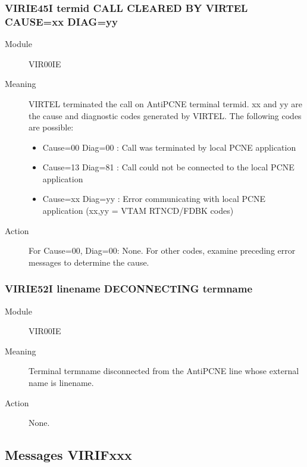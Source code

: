 \documentclass[letterpaper,10pt,english]{sphinxmanual}
\begin{document}
\subsubsection{VIRIE45I termid CALL CLEARED BY VIRTEL CAUSE=xx DIAG=yy}
\label{\detokenize{messages:virie45i-termid-call-cleared-by-virtel-cause-xx-diag-yy}}\begin{description}
\item[{Module}] \leavevmode
VIR00IE

\item[{Meaning}] \leavevmode
VIRTEL terminated the call on AntiPCNE terminal termid. xx and yy are the cause and diagnostic codes generated by VIRTEL. The following codes are possible:
\begin{itemize}
\item {} 
Cause=00 Diag=00 : Call was terminated by local PCNE application

\item {} 
Cause=13 Diag=81 : Call could not be connected to the local PCNE application

\item {} 
Cause=xx Diag=yy : Error communicating with local PCNE application (xx,yy = VTAM RTNCD/FDBK codes)

\end{itemize}

\item[{Action}] \leavevmode
For Cause=00, Diag=00: None. For other codes, examine preceding error messages to determine the cause.

\end{description}


\subsubsection{VIRIE52I linename DECONNECTING termname}
\label{\detokenize{messages:virie52i-linename-deconnecting-termname}}\begin{description}
\item[{Module}] \leavevmode
VIR00IE

\item[{Meaning}] \leavevmode
Terminal termname disconnected from the AntiPCNE line whose external name is linename.

\item[{Action}] \leavevmode
None.

\end{description}


\subsection{Messages VIRIFxxx}
\label{\detokenize{messages:messages-virifxxx}}
\end{document}
